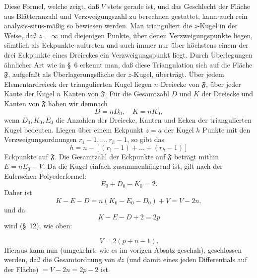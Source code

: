 \documentclass{article}
\begin{document}
Diese Formel, welche zeigt, daß $V$ stets gerade ist, und das Geschlecht der Fläche aus Blätteranzahl und Verzweigungszahl zu berechnen gestattet, kann auch rein analysis-situs-mäßig so bewiesen werden. Man trianguliert die $z$-Kugel in der Weise, daß $z = \infty$ und diejenigen Punkte, über denen Verzweigungspunkte liegen, sämtlich als Eckpunkte auftreten und auch immer nur über höchstens einem der drei Eckpunkte eines Dreieckes ein Verzweigungspunkt liegt. Durch Überlegungen ähnlicher Art wie in §~6 erkennt man, daß diese Triangulation sich auf die Fläche $\mathfrak{F}$, aufgefaßt als Überlagerungsfläche der $z$-Kugel, überträgt. Über jedem Elementardreieck der triangulierten Kugel liegen $n$ Dreiecke von $\mathfrak{F}$, über jeder Kante der Kugel $n$ Kanten von $\mathfrak{F}$. Für die Gesamtzahl $D$ und $K$ der Dreiecke und Kanten von $\mathfrak{F}$ haben wir demnach
\[ D = n D_0, \quad K = n K_0, \]
wenn $D_0, K_0, E_0$ die Anzahlen der Dreiecke, Kanten und Ecken der triangulierten Kugel bedeuten. Liegen über einem Eckpunkt $z = a$ der Kugel $h$ Punkte mit den Verzweigungsordnungen $r_1 - 1, \dots, r_h - 1$, so gibt das
\[ h = n - [(r_1 - 1) + \dots + (r_h - 1)] \]
Eckpunkte auf $\mathfrak{F}$. Die Gesamtzahl der Eckpunkte auf $\mathfrak{F}$ beträgt mithin $E = n E_0 - V$. Da die Kugel einfach zusammenhängend ist, gilt nach der Eulerschen Polyederformel:
\[ E_0 + D_0 - K_0 = 2. \]
Daher ist
\[ K - E - D = n(K_0 - E_0 - D_0) + V = V - 2n, \]
und da
\[ K - E - D + 2 = 2p \]
wird (§~12), wie oben:

\[ V = 2(p + n - 1). \]
Hieraus kann nun (umgekehrt, wie es im vorigen Absatz geschah), geschlossen werden, daß die Gesamtordnung von $dz$ (und damit eines jeden Differentials auf der Fläche) $= V - 2n = 2p - 2$ ist.
\end{document}
